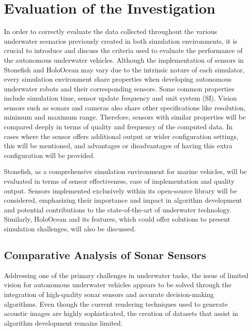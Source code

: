 \documentclass[]{article}
\begin{document}
	\newpage
	
	\section{Evaluation of the Investigation}
	
	
	In order to correctly evaluate the data collected throughout the various underwater scenarios previously created in both simulation environments, it is crucial to introduce and discuss the criteria used to evaluate the performance of the autonomous underwater vehicles. Although the implementation of sensors in Stonefish and HoloOcean may vary due to the intrinsic nature of each simulator, every simulation environment share properties when developing autonomous underwater robots and their corresponding sensors. Some common properties include simulation time, sensor update frequency and unit system (SI). Vision sensors such as sonars and cameras also share other specifications like resolution, minimum and maximum range. Therefore, sensors with similar properties will be compared deeply in terms of quality and frequency of the computed data. In cases where the sensor offers additional output or wider configuration settings, this will be mentioned, and advantages or disadvantages of having this extra configuration will be provided.
	
	Stonefish, as a comprehensive simulation environment for marine vehicles, will be evaluated in terms of sensor effectiveness, ease of implementation and quality output. Sensors implemented exclusively within its open-source library will be considered, emphasizing their importance and impact in algorithm development and potential contributions to the state-of-the-art of underwater technology. Similarly, HoloOcean and its features, which could offer solutions to present simulation challenges, will also be discussed.
	
	\subsection{Comparative Analysis of Sonar Sensors}
	
	Addressing one of the primary challenges in underwater tasks, the issue of limited vision for autonomous underwater vehicles appears to be solved through the integration of high-quality sonar sensors and accurate decision-making algorithms. Even though the current rendering techniques used to generate acoustic images are highly sophisticated, the creation of datasets that assist in algorithm development remains limited.
	
\end{document}

